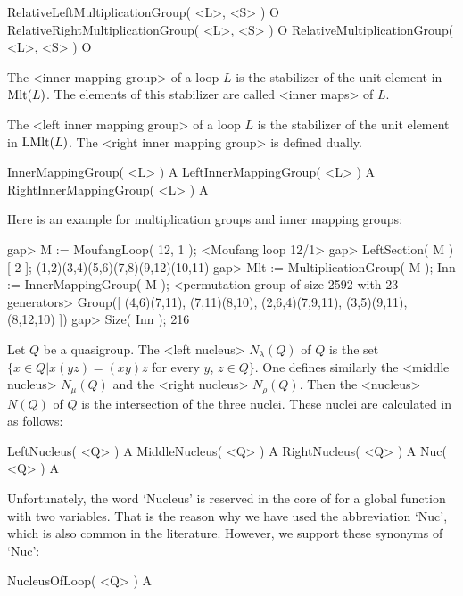 \>RelativeLeftMultiplicationGroup( <L>, <S> ) O
\>RelativeRightMultiplicationGroup( <L>, <S> ) O
\>RelativeMultiplicationGroup( <L>, <S> ) O


The <inner mapping group>
%
%
 of a loop $L$ is the stabilizer of the
unit element in ${\rm{Mlt}}(L)$. The elements of this stabilizer are called
<inner maps> of $L$.

The <left inner mapping group>
%
%
 of a loop $L$ is the stabilizer of the unit
element in ${\rm{LMlt}}(L)$. The <right inner mapping group>
%
%
 is defined dually.

\>InnerMappingGroup( <L> ) A
\>LeftInnerMappingGroup( <L> ) A
\>RightInnerMappingGroup( <L> ) A

Here is an example for multiplication groups and inner mapping groups:

\beginexample
gap> M := MoufangLoop( 12, 1 );
<Moufang loop 12/1>
gap> LeftSection( M )[ 2 ];
(1,2)(3,4)(5,6)(7,8)(9,12)(10,11)
gap> Mlt := MultiplicationGroup( M ); Inn := InnerMappingGroup( M );
<permutation group of size 2592 with 23 generators>
Group([ (4,6)(7,11), (7,11)(8,10), (2,6,4)(7,9,11), (3,5)(9,11), (8,12,10) ])
gap> Size( Inn );
216
\endexample


Let $Q$ be a quasigroup. The <left nucleus>
%
%
 $N_\lambda(Q)$ of $Q$ is the
set $\{x\in Q| x(yz)=(xy)z$ for every $y$, $z\in Q\}$. One defines similarly
the <middle nucleus>
%
%
 $N_\mu(Q)$ and the <right nucleus>
%
%
 $N_\rho(Q)$.
Then the <nucleus>
%
%
 $N(Q)$ of $Q$ is the intersection of the three nuclei.
These nuclei are calculated in {\LOOPS} as follows:

\>LeftNucleus( <Q> ) A
\>MiddleNucleus( <Q> ) A
\>RightNucleus( <Q> ) A
\>Nuc( <Q> ) A

Unfortunately, the word `Nucleus' is reserved in the core of {\GAP} for a
global function with two variables. That is the reason why we have used the
abbreviation `Nuc', which is also common in the literature. However, we support
these synonyms of `Nuc':

\>NucleusOfLoop( <Q> ) A

